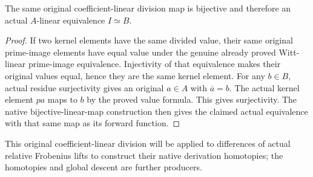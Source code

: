 \begin{theorem}
\label{thm:witt-two-algebra-division-equivalence}
\leanok
{}
The same original coefficient-linear division map is bijective and
therefore an actual $A$-linear equivalence $I\simeq B$.
\end{theorem}
\begin{proof}
If two kernel elements have the same divided value, their same original
prime-image elements have equal value under the genuine already proved
Witt-linear prime-image equivalence. Injectivity of that equivalence
makes their original values equal, hence they are the same kernel element.
For any $b\in B$, actual residue surjectivity gives an original $a\in A$
with $\overline a=b$. The actual kernel element $pa$ maps to $b$ by the
proved value formula. This gives surjectivity. The native bijective-linear-map
construction then gives the claimed actual equivalence with that same
map as its forward function.
\end{proof}

This original coefficient-linear division will be applied to differences
of actual relative Frobenius lifts to construct their native derivation
homotopies; the homotopies and global descent are further producers.
